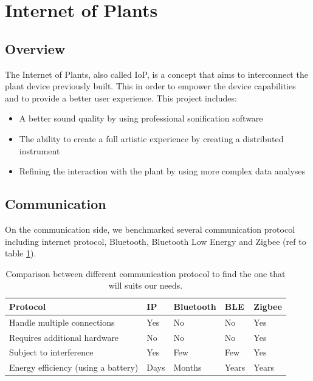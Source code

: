 \section{Internet of Plants}

\subsection{Overview}

The Internet of Plants, also called IoP, is a concept that aims to interconnect the plant device previously built.
This in order to empower the device capabilities and to provide a better user experience.
This project includes:
\begin{itemize}
    \item A better sound quality by using professional sonification software
    \item The ability to create a full artistic experience by creating a distributed instrument
    \item Refining the interaction with the plant by using more complex data analyses
\end{itemize}



\subsection{Communication}

On the communication side, we benchmarked several communication protocol including internet protocol,
Bluetooth, Bluetooth Low Energy and Zigbee (ref to table \ref{tab:protocol_comparison}).

\begin{table}[]
    \begin{tabular}{|l|l|l|l|l|}
    \hline
    Protocol                            & IP   & Bluetooth & BLE   & Zigbee \\ \hline
    Handle multiple connections         & Yes  & No        & No    & Yes    \\
    Requires additional hardware        & No   & No        & No    & Yes    \\
    Subject to interference             & Yes  & Few       & Few   & Yes    \\
    Energy efficiency (using a battery) & Days & Months    & Years & Years  \\ \hline
    \end{tabular}
    \caption{Comparison between different communication protocol to find the one that will suits our needs.}
    \label{tab:protocol_comparison}
\end{table}

